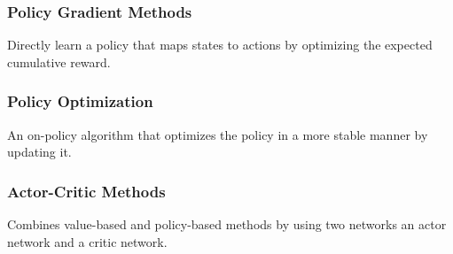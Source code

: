 \documentclass[12pt]{article}
\begin{document}
 \subsubsection{Policy Gradient Methods}
Directly learn a policy that maps states to actions by optimizing the expected cumulative reward.

 \subsubsection{ Policy Optimization} 
An on-policy algorithm that optimizes the policy in a more stable manner by  updating it.

 \subsubsection{Actor-Critic Methods}
Combines value-based and policy-based methods by using two networks an actor network and a critic  network.
\end{document}
